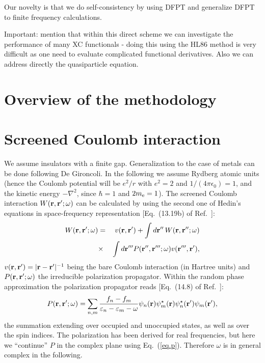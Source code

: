 \documentclass[twocolumn,prb,showpacs,superscriptaddress]{revtex4}
\def\w{\omega}
\def\E{\varepsilon}
\def\r{{\bf r}}
\def\rp{{\bf r^\prime}}
\def\rpp{{\bf r^{\prime\prime}}}
\def\rppp{{\bf r^{\prime\prime\prime}}}
\begin{document}
Our novelty is that we do self-consistency by using DFPT
and generalize DFPT to finite frequency calculations.

Important: mention that within this direct scheme we can investigate
the performance of many XC functionals - doing this using the HL86
method is very difficult as one need to evaluate complicated functional
derivatives. Also we can address directly the quasiparticle equation.


\section{Overview of the methodology}

\section{Screened Coulomb interaction}

We assume insulators with a finite gap. Generalization to the case of metals
can be done following De Gironcoli.
In the following we assume Rydberg atomic units (hence the Coulomb potential
will be $e^2/r$ with $e^2=2$ and $1/(4\pi\epsilon_0)=1$, and the kinetic energy $-\nabla^2$, since $\hbar=1$ 
and $2m_{\rm e}=1$).
The screened Coulomb interaction $W(\r,\rp;\w)$ can be calculated by using
the second one of Hedin's equations in space-frequency representation
[Eq.\ (13.19b) of Ref.~]:
  \begin{eqnarray}\label{eq.w}
  W(\r,\rp;\w) & = & v(\r,\rp) + \int d\rpp \,W(\r,\rpp;\w)  \nonumber \\
   & \times & \int d\rppp P(\rpp,\rppp;\w) v(\rppp,\rp), 
  \end{eqnarray}
$v(\r,\rp)=|\r-\rp|^{-1}$ being the bare Coulomb interaction (in Hartree units) and
$P(\r,\rp;\w)$ the irreducible polarization propagator. 
Within the random phase approximation the polarization propagator reads 
[Eq.\ (14.8) of Ref.~]:
  \begin{equation}\label{eq.p}
  P(\r,\rp;\w) = \sum_{n,m} \frac{f_n-f_m}{\E_n-\E_m-\w} 
  \psi_n(\r)\psi_m^\star(\r)  \psi_n^\star(\rp)\psi_m(\rp),
  \end{equation}
the summation extending over occupied and unoccupied states, as well as
over the spin indices.\cite{note.w.even}
The polarization has been derived for real frequencies, but here we ``continue''
$P$ in the complex plane using Eq.\ (\ref{eq.p}). Therefore $\w$ is in general complex
in the following.
\end{document}
